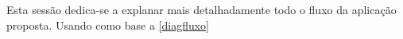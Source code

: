 Esta sessão dedica-se a explanar mais detalhadamente todo o fluxo da aplicação proposta. Usando como base a \autoref{diagfluxo}
